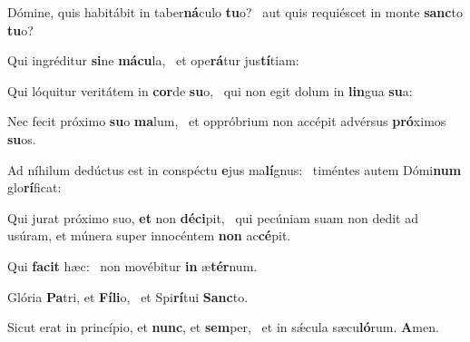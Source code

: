 \item Dómine, quis habitábit in taber\textbf{ná}culo \textbf{tu}o?~\psstar{} aut quis requiéscet in monte \textbf{sanc}to \textbf{tu}o?
\item Qui ingréditur \textbf{si}ne \textbf{má}\textbf{cu}la,~\psstar{} et ope\textbf{rá}tur jus\textbf{tí}tiam:
\item Qui lóquitur veritátem in \textbf{cor}de \textbf{su}o,~\psstar{} qui non egit dolum in \textbf{lin}gua \textbf{su}a:
\item Nec fecit próximo \textbf{su}o \textbf{ma}lum,~\psstar{} et oppróbrium non accépit advérsus \textbf{pró}ximos \textbf{su}os.
\item Ad níhilum dedúctus est in conspéctu \textbf{e}jus ma\textbf{lí}gnus:~\psstar{} timéntes autem Dómi\textbf{num} glo\textbf{rí}ficat:
\item Qui jurat próximo suo, \textbf{et} non \textbf{dé}\textbf{ci}pit,~\psstar{} qui pecúniam suam non dedit ad usúram, et múnera super innocéntem \textbf{non} ac\textbf{cé}pit.
\item Qui \textbf{fa}\textbf{cit} hæc:~\psstar{} non movébitur \textbf{in} æ\textbf{tér}num.
\item Glória \textbf{Pa}tri, et \textbf{Fí}\textbf{li}o,~\psstar{} et Spi\textbf{rí}tui \textbf{Sanc}to.
\item Sicut erat in princípio, et \textbf{nunc}, et \textbf{sem}per,~\psstar{} et in sǽcula sæcu\textbf{ló}rum. \textbf{A}men.
